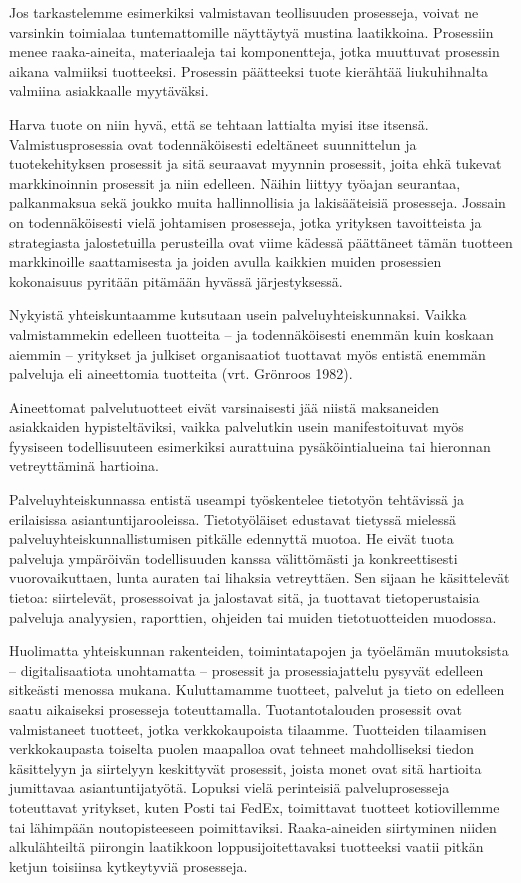 \documentclass[
  finnish,
  letterpaper,
  DIV=11,
  numbers=noendperiod,
  oneside]{scrreprt}
\begin{document}
Jos tarkastelemme esimerkiksi valmistavan teollisuuden prosesseja,
voivat ne varsinkin toimialaa tuntemattomille näyttäytyä mustina
laatikkoina. Prosessiin menee raaka-aineita, materiaaleja tai
komponentteja, jotka muuttuvat prosessin aikana valmiiksi tuotteeksi.
Prosessin päätteeksi tuote kierähtää liukuhihnalta valmiina asiakkaalle
myytäväksi.

Harva tuote on niin hyvä, että se tehtaan lattialta myisi itse itsensä.
Valmistusprosessia ovat todennäköisesti edeltäneet suunnittelun ja
tuotekehityksen prosessit ja sitä seuraavat myynnin prosessit, joita
ehkä tukevat markkinoinnin prosessit ja niin edelleen. Näihin liittyy
työajan seurantaa, palkanmaksua sekä joukko muita hallinnollisia ja
lakisääteisiä prosesseja. Jossain on todennäköisesti vielä johtamisen
prosesseja, jotka yrityksen tavoitteista ja strategiasta jalostetuilla
perusteilla ovat viime kädessä päättäneet tämän tuotteen markkinoille
saattamisesta ja joiden avulla kaikkien muiden prosessien kokonaisuus
pyritään pitämään hyvässä järjestyksessä.

Nykyistä yhteiskuntaamme kutsutaan usein palveluyhteiskunnaksi. Vaikka
valmistammekin edelleen tuotteita -- ja todennäköisesti enemmän kuin
koskaan aiemmin -- yritykset ja julkiset organisaatiot tuottavat myös
entistä enemmän palveluja eli aineettomia tuotteita (vrt. Grönroos
1982).

Aineettomat palvelutuotteet eivät varsinaisesti jää niistä maksaneiden
asiakkaiden hypisteltäviksi, vaikka palvelutkin usein manifestoituvat
myös fyysiseen todellisuuteen esimerkiksi aurattuina pysäköintialueina
tai hieronnan vetreyttäminä hartioina.

Palveluyhteiskunnassa entistä useampi työskentelee tietotyön tehtävissä
ja erilaisissa asiantuntijarooleissa. Tietotyöläiset edustavat tietyssä
mielessä palveluyhteiskunnallistumisen pitkälle edennyttä muotoa. He
eivät tuota palveluja ympäröivän todellisuuden kanssa välittömästi ja
konkreettisesti vuorovaikuttaen, lunta auraten tai lihaksia vetreyttäen.
Sen sijaan he käsittelevät tietoa: siirtelevät, prosessoivat ja
jalostavat sitä, ja tuottavat tietoperustaisia palveluja analyysien,
raporttien, ohjeiden tai muiden tietotuotteiden muodossa.

Huolimatta yhteiskunnan rakenteiden, toimintatapojen ja työelämän
muutoksista -- digitalisaatiota unohtamatta -- prosessit ja
prosessiajattelu pysyvät edelleen sitkeästi menossa mukana. Kuluttamamme
tuotteet, palvelut ja tieto on edelleen saatu aikaiseksi prosesseja
toteuttamalla. Tuotantotalouden prosessit ovat valmistaneet tuotteet,
jotka verkkokaupoista tilaamme. Tuotteiden tilaamisen verkkokaupasta
toiselta puolen maapalloa ovat tehneet mahdolliseksi tiedon käsittelyyn
ja siirtelyyn keskittyvät prosessit, joista monet ovat sitä hartioita
jumittavaa asiantuntijatyötä. Lopuksi vielä perinteisiä
palveluprosesseja toteuttavat yritykset, kuten Posti tai FedEx,
toimittavat tuotteet kotiovillemme tai lähimpään noutopisteeseen
poimittaviksi. Raaka-aineiden siirtyminen niiden alkulähteiltä piirongin
laatikkoon loppusijoitettavaksi tuotteeksi vaatii pitkän ketjun
toisiinsa kytkeytyviä prosesseja.
\end{document}
